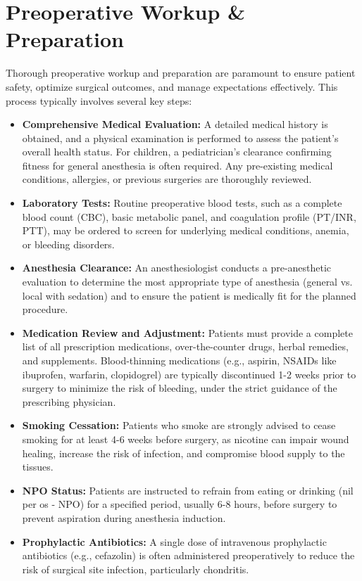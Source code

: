 \section*{Preoperative Workup \& Preparation}
Thorough preoperative workup and preparation are paramount to ensure patient safety, optimize surgical outcomes, and manage expectations effectively. This process typically involves several key steps:

\begin{itemize}
  \item \textbf{Comprehensive Medical Evaluation:} A detailed medical history is obtained, and a physical examination is performed to assess the patient's overall health status. For children, a pediatrician's clearance confirming fitness for general anesthesia is often required. Any pre-existing medical conditions, allergies, or previous surgeries are thoroughly reviewed.
  \item \textbf{Laboratory Tests:} Routine preoperative blood tests, such as a complete blood count (CBC), basic metabolic panel, and coagulation profile (PT/INR, PTT), may be ordered to screen for underlying medical conditions, anemia, or bleeding disorders.
  \item \textbf{Anesthesia Clearance:} An anesthesiologist conducts a pre-anesthetic evaluation to determine the most appropriate type of anesthesia (general vs. local with sedation) and to ensure the patient is medically fit for the planned procedure.
  \item \textbf{Medication Review and Adjustment:} Patients must provide a complete list of all prescription medications, over-the-counter drugs, herbal remedies, and supplements. Blood-thinning medications (e.g., aspirin, NSAIDs like ibuprofen, warfarin, clopidogrel) are typically discontinued 1-2 weeks prior to surgery to minimize the risk of bleeding, under the strict guidance of the prescribing physician.
  \item \textbf{Smoking Cessation:} Patients who smoke are strongly advised to cease smoking for at least 4-6 weeks before surgery, as nicotine can impair wound healing, increase the risk of infection, and compromise blood supply to the tissues.
  \item \textbf{NPO Status:} Patients are instructed to refrain from eating or drinking (nil per os - NPO) for a specified period, usually 6-8 hours, before surgery to prevent aspiration during anesthesia induction.
  \item \textbf{Prophylactic Antibiotics:} A single dose of intravenous prophylactic antibiotics (e.g., cefazolin) is often administered preoperatively to reduce the risk of surgical site infection, particularly chondritis.

\end{itemize}
